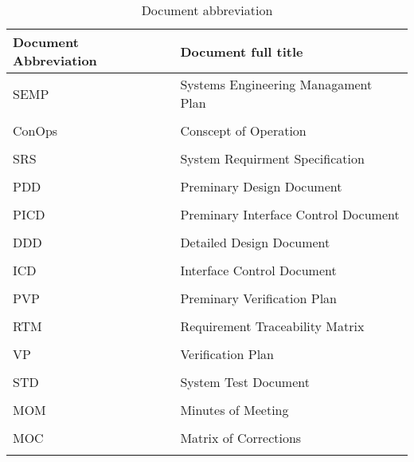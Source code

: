 \begin{table}[h]
	\centering
	\begin{tabular}{ll}
		\textbf{Document Abbreviation} & \textbf{Document full title} \\ \hline
		SEMP & Systems Engineering Managament Plan \\
		& \\
		ConOps & Conscept of Operation \\
		& \\
		SRS & System Requirment Specification \\
		& \\
		PDD & Preminary Design Document \\
		& \\
		PICD & Preminary Interface Control Document \\
		& \\
		DDD & Detailed Design Document \\
		& \\
		ICD & Interface Control Document \\
		& \\
		PVP & Preminary Verification Plan \\
		& \\
		RTM & Requirement Traceability Matrix \\
		& \\
		VP & Verification Plan \\
		& \\
		STD & System Test Document \\
		& \\
		MOM & Minutes of Meeting \\
		& \\
		MOC & Matrix of Corrections \\
		& \\
	\end{tabular}
	\caption{Document abbreviation}
	\label{tab:names}
\end{table}